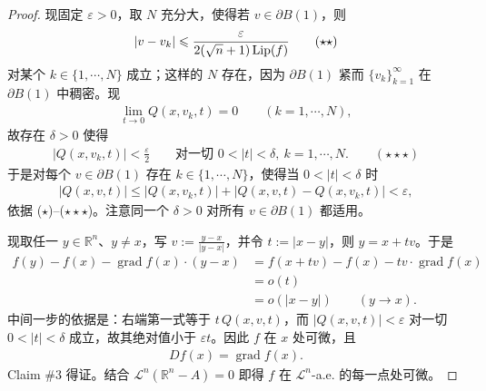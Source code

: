 \documentclass[../../main.tex]{subfiles}%
\begin{document}
\begin{proof}
现固定 $\varepsilon>0$，取 $N$ 充分大，使得若 $v\in\partial B(1)$，则
\begin{align*}
\lvert v-v_k\rvert\leqslant\frac{\varepsilon}{2(\sqrt{n}+1)\operatorname{Lip}(f)}\qquad(\star\star)
\end{align*}
对某个 $k\in\{1,\cdots,N\}$ 成立；这样的 $N$ 存在，因为 $\partial B(1)$ 紧而 $\{v_k\}_{k=1}^{\infty}$ 在 $\partial B(1)$ 中稠密。现
\begin{align*}
\lim_{t\to0}Q(x,v_k,t)=0\qquad(k=1,\cdots,N),
\end{align*}
故存在 $\delta>0$ 使得
\begin{align*}
\lvert Q(x,v_k,t)\rvert<\frac{\varepsilon}{2}\qquad\text{对一切 }0<\lvert t\rvert<\delta,\ k=1,\cdots,N.\qquad(\star\star\star)
\end{align*}
于是对每个 $v\in\partial B(1)$ 存在 $k\in\{1,\cdots,N\}$，使得当 $0<\lvert t\rvert<\delta$ 时
\begin{align*}
\lvert Q(x,v,t)\rvert\leqslant\lvert Q(x,v_k,t)\rvert+\lvert Q(x,v,t)-Q(x,v_k,t)\rvert<\varepsilon,
\end{align*}
依据 ($\star$)--($\star\star\star$)。注意同一个 $\delta>0$ 对所有 $v\in\partial B(1)$ 都适用。

现取任一 $y\in\mathbb{R}^n$、$y\neq x$，写 $v:=\frac{y-x}{\lvert y-x\rvert}$，并令 $t:=\lvert x-y\rvert$，则 $y=x+tv$。于是
\begin{align*}
f(y)-f(x)-\operatorname{grad}f(x)\cdot(y-x)
&=f(x+tv)-f(x)-tv\cdot\operatorname{grad}f(x)\\
&=o(t)\\
&=o(\lvert x-y\rvert)\qquad(y\to x).
\end{align*}
中间一步的依据是：右端第一式等于 $t\,Q(x,v,t)$，而 $\lvert Q(x,v,t)\rvert<\varepsilon$ 对一切 $0<\lvert t\rvert<\delta$ 成立，故其绝对值小于 $\varepsilon t$。因此 $f$ 在 $x$ 处可微，且
\begin{align*}
Df(x)=\operatorname{grad}f(x).
\end{align*}
Claim \#3 得证。结合 $\mathcal{L}^n(\mathbb{R}^n-A)=0$ 即得 $f$ 在 $\mathcal{L}^n$-a.e. 的每一点处可微。
\end{proof}
\end{document}
